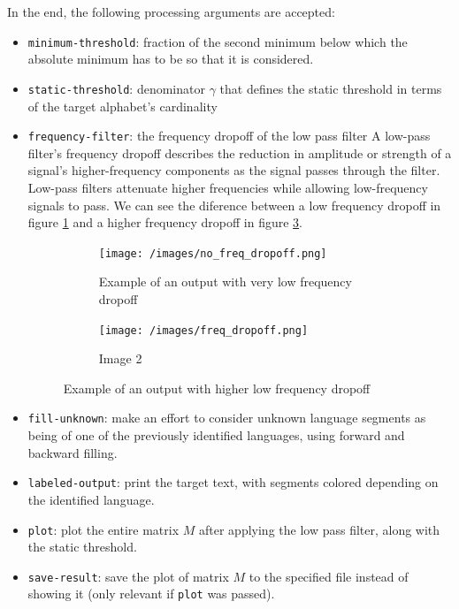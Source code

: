\documentclass{article}
\begin{document}
In the end, the following processing arguments are accepted:
\begin{itemize}
    \item \verb|minimum-threshold|: fraction of the second minimum below which the absolute minimum has to be so that it is considered.
    \item \verb|static-threshold|: denominator $\gamma$ that defines the static threshold in terms of the target alphabet's cardinality
    \item \verb|frequency-filter|: the frequency dropoff of the low pass filter
    A low-pass filter's frequency dropoff describes the reduction in amplitude or strength of a signal's higher-frequency components as the signal passes through the filter. 
    Low-pass filters attenuate higher frequencies while allowing low-frequency signals to pass. 
    We can see the diference between a low frequency dropoff in figure \ref{fig:no_freq_dropoff} and a higher frequency dropoff in figure \ref{fig:freq_dropoff}.

    \begin{figure}
        \centering
        \begin{subfigure}[b]{0.4\textwidth}
            \centering
            \texttt{[image: /images/no\_freq\_dropoff.png]}
            \caption{Example of an output with very low frequency dropoff}
            \label{fig:no_freq_dropoff}
        \end{subfigure}
        \hfill
        \begin{subfigure}[b]{0.4\textwidth}
            \centering
            \texttt{[image: /images/freq\_dropoff.png]}
            \caption{Image 2}
            \label{fig:image2}
        \end{subfigure}
        \caption{Example of an output with higher low frequency dropoff}
        \label{fig:freq_dropoff}
    \end{figure}


    \item \verb|fill-unknown|: make an effort to consider unknown language segments as being of one of the previously identified languages, using forward and backward filling.
    \item \verb|labeled-output|: print the target text, with segments colored depending on the identified language.
    \item \verb|plot|: plot the entire matrix $M$ after applying the low pass filter, along with the static threshold.
    \item \verb|save-result|: save the plot of matrix $M$ to the specified file instead of showing it (only relevant if \verb|plot| was passed).
\end{itemize}
\end{document}
